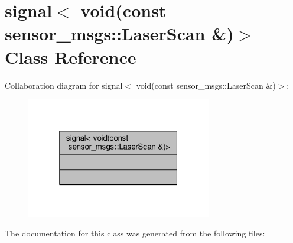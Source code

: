 \hypertarget{classboost_1_1signals2_1_1signal_3_01void_07const_01sensor__msgs_1_1LaserScan_01_6_08_4}{}\section{signal$<$ void(const sensor\+\_\+msgs\+:\+:Laser\+Scan \&)$>$ Class Reference}
\label{classboost_1_1signals2_1_1signal_3_01void_07const_01sensor__msgs_1_1LaserScan_01_6_08_4}


Collaboration diagram for signal$<$ void(const sensor\+\_\+msgs\+:\+:Laser\+Scan \&)$>$\+:
\nopagebreak
\begin{figure}[H]
\begin{center}
\leavevmode
\includegraphics[width=229pt]{classboost_1_1signals2_1_1signal_3_01void_07const_01sensor__msgs_1_1LaserScan_01_6_08_4__coll__graph}
\end{center}
\end{figure}


The documentation for this class was generated from the following files\+: